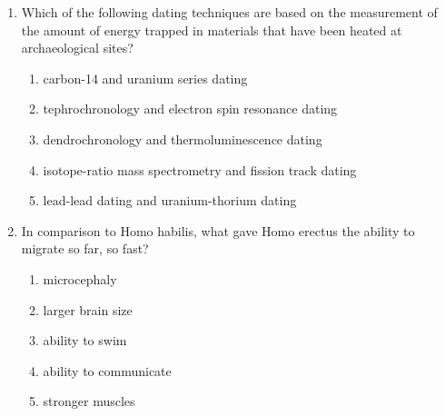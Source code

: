 \documentclass[12pt]{article}
\begin{document}
\begin{enumerate}[label=\arabic*.]
\item Which of the following dating techniques are based on the measurement of the amount of energy trapped in materials that have been heated at archaeological sites?
\begin{enumerate}[label=(\alph*)]
    \item carbon-14 and uranium series dating
    \item tephrochronology and electron spin resonance dating
    \item dendrochronology and thermoluminescence dating
    \item isotope-ratio mass spectrometry and fission track dating
    \item lead-lead dating and uranium-thorium dating
\end{enumerate}
\item In comparison to Homo habilis, what gave Homo erectus the ability to migrate so far, so fast?
\begin{enumerate}[label=(\alph*)]
    \item microcephaly
    \item larger brain size
    \item ability to swim
    \item ability to communicate
    \item stronger muscles
\end{enumerate}
\end{enumerate}
\end{document}
